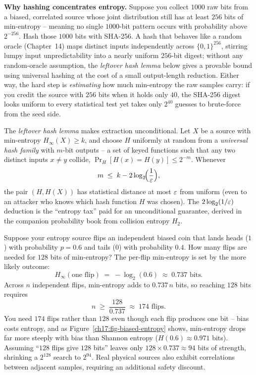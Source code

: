 \begin{whybox}
\textbf{Why hashing concentrates entropy.} Suppose you collect $1000$ raw bits from a biased, correlated source whose joint distribution still has at least $256$ bits of min-entropy -- meaning no single $1000$-bit pattern occurs with probability above $2^{-256}$. Hash those $1000$ bits with SHA-256. A hash that behaves like a random oracle (Chapter~14) maps distinct inputs independently across $\{0,1\}^{256}$, stirring lumpy input unpredictability into a nearly uniform $256$-bit digest; without any random-oracle assumption, the \emph{leftover hash lemma} below gives a provable bound using universal hashing at the cost of a small output-length reduction. Either way, the hard step is \emph{estimating} how much min-entropy the raw samples carry: if you credit the source with $256$ bits when it holds only $40$, the SHA-256 digest looks uniform to every statistical test yet takes only $2^{40}$ guesses to brute-force from the seed side.
\end{whybox}

\begin{connectionbox}
The \emph{leftover hash lemma} makes extraction unconditional. Let $X$ be a source with min-entropy $H_\infty(X) \ge k$, and choose $H$ uniformly at random from a \emph{universal hash family} with $m$-bit outputs -- a set of keyed functions such that any two distinct inputs $x \ne y$ collide, $\Pr_H[H(x) = H(y)] \le 2^{-m}$. Whenever
\[
  m \;\le\; k - 2\log_2\!\Bigl(\frac{1}{\varepsilon}\Bigr),
\]
the pair $(H, H(X))$ has statistical distance at most $\varepsilon$ from uniform (even to an attacker who knows which hash function $H$ was chosen). The $2\log_2(1/\varepsilon)$ deduction is the ``entropy tax'' paid for an unconditional guarantee, derived in the companion probability book from collision entropy $H_2$.
\end{connectionbox}

\begin{example}
\label{ch17:biased-coin}
Suppose your entropy source flips an independent biased coin that lands heads ($1$) with probability $p = 0.6$ and tails ($0$) with probability $0.4$. How many flips are needed for $128$ bits of min-entropy? The per-flip min-entropy is set by the more likely outcome:
\[
  H_\infty(\text{one flip}) \;=\; -\log_2(0.6) \;\approx\; 0.737 \text{ bits}.
\]
Across $n$ independent flips, min-entropy adds to $0.737\,n$ bits, so reaching $128$ bits requires
\[
  n \;\ge\; \frac{128}{0.737} \;\approx\; 174 \text{ flips}.
\]
You need $174$ flips rather than $128$ even though each flip produces one bit -- bias costs entropy, and as Figure~\ref{ch17:fig-biased-entropy} shows, min-entropy drops far more steeply with bias than Shannon entropy ($H(0.6) \approx 0.971$ bits). Assuming ``$128$ flips give $128$ bits'' leaves only $128 \times 0.737 \approx 94$ bits of strength, shrinking a $2^{128}$ search to $2^{94}$. Real physical sources also exhibit correlations between adjacent samples, requiring an additional safety discount.
\end{example}

